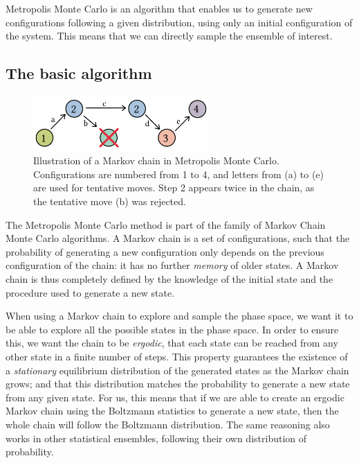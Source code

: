 \documentclass[thesis]{subfiles}
\begin{document}
Metropolis Monte Carlo is an algorithm that enables us to generate new
configurations following a given distribution, using only an initial
configuration of the system. This means that we can directly sample the ensemble
of interest.

\subsection{The basic algorithm}

\begin{figure}[ht]
    \centering
    \includegraphics[width=0.6\textwidth]{figures/images/mc-chain}
    \caption{Illustration of a Markov chain in Metropolis Monte Carlo.
    Configurations are numbered from 1 to 4, and letters from (a) to (e) are used
    for tentative moves. Step 2 appears twice in the chain, as the tentative
    move (b) was rejected.}
    \label{fig:mc:chain}
\end{figure}

The Metropolis Monte Carlo method is part of the family of Markov Chain Monte
Carlo algorithms. A Markov chain is a set of configurations, such that the
probability of generating a new configuration only depends on the previous
configuration of the chain: it has no further \emph{memory} of older states. A
Markov chain is thus completely defined by the knowledge of the initial state
and the procedure used to generate a new state.

When using a Markov chain to explore and sample the phase space, we want it to
be able to explore all the possible states in the phase space. In order to
ensure this, we want the chain to be \emph{ergodic}, \ie that each state can be
reached from any other state in a finite number of steps. This property
guarantees the existence of a \emph{stationary} equilibrium distribution of the
generated states as the Markov chain grows; and that this distribution matches
the probability to generate a new state from any given state. For us, this means
that if we are able to create an ergodic Markov chain using the Boltzmann
statistics to generate a new state, then the whole chain will follow the
Boltzmann distribution. The same reasoning also works in other statistical
ensembles, following their own distribution of probability.
\end{document}
